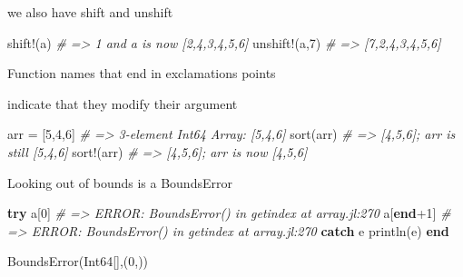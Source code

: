 \documentclass[ignorenonframetext,]{beamer}
\newenvironment{Shaded}{}{}
\newcommand{\KeywordTok}[1]{\textcolor[rgb]{0.00,0.44,0.13}{\textbf{{#1}}}}
\newcommand{\DataTypeTok}[1]{\textcolor[rgb]{0.56,0.13,0.00}{{#1}}}
\newcommand{\FloatTok}[1]{\textcolor[rgb]{0.25,0.63,0.44}{{#1}}}
\newcommand{\CommentTok}[1]{\textcolor[rgb]{0.38,0.63,0.69}{\textit{{#1}}}}
\newcommand{\NormalTok}[1]{{#1}}
\begin{document}
\begin{frame}[fragile]{we also have shift and unshift}

\begin{Shaded}
\begin{Highlighting}[]
\NormalTok{shift!(a) }\CommentTok{# => 1 and a is now [2,4,3,4,5,6]}
\NormalTok{unshift!(a,}\FloatTok{7}\NormalTok{) }\CommentTok{# => [7,2,4,3,4,5,6]}
\end{Highlighting}
\end{Shaded}

\end{frame}

\begin{frame}[fragile]{Function names that end in exclamations points}

indicate that they modify their argument

\begin{Shaded}
\begin{Highlighting}[]
\NormalTok{arr = [}\FloatTok{5}\NormalTok{,}\FloatTok{4}\NormalTok{,}\FloatTok{6}\NormalTok{] }\CommentTok{# => 3-element Int64 Array: [5,4,6]}
\NormalTok{sort(arr) }\CommentTok{# => [4,5,6]; arr is still [5,4,6]}
\NormalTok{sort!(arr) }\CommentTok{# => [4,5,6]; arr is now [4,5,6]}
\end{Highlighting}
\end{Shaded}

\end{frame}

\begin{frame}[fragile]{Looking out of bounds is a BoundsError}

\begin{Shaded}
\begin{Highlighting}[]
\KeywordTok{try}
    \NormalTok{a[}\FloatTok{0}\NormalTok{] }\CommentTok{# => ERROR: BoundsError() in getindex at array.jl:270}
    \NormalTok{a[}\KeywordTok{end}\NormalTok{+}\FloatTok{1}\NormalTok{] }\CommentTok{# => ERROR: BoundsError() in getindex at array.jl:270}
\KeywordTok{catch} \NormalTok{e}
    \NormalTok{println(e)}
\KeywordTok{end}
\end{Highlighting}
\end{Shaded}

\begin{Shaded}
\begin{Highlighting}[]
\NormalTok{BoundsError(}\DataTypeTok{Int64}\NormalTok{[],(}\FloatTok{0}\NormalTok{,))}
\end{Highlighting}
\end{Shaded}

\end{frame}
\end{document}

